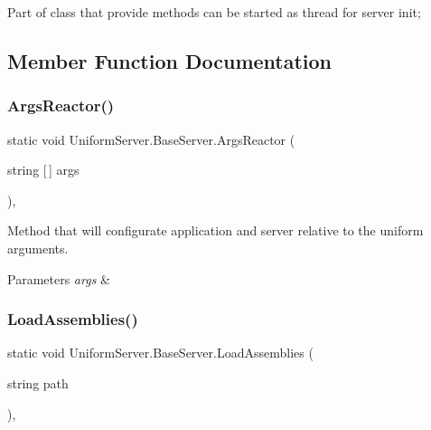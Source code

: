 Part of class that provide methods can be started as thread for server init; 

\subsection{Member Function Documentation}
\mbox{\label{class_uniform_server_1_1_base_server_a992660752da60019c348e18226a87bf2}} 
\subsubsection{\texorpdfstring{Args\+Reactor()}{ArgsReactor()}}
{\footnotesize\ttfamily static void Uniform\+Server.\+Base\+Server.\+Args\+Reactor (\begin{DoxyParamCaption}\item[{string \mbox{[}$\,$\mbox{]}}]{args }\end{DoxyParamCaption})\hspace{0.3cm}{\ttfamily [static]}, {\ttfamily [protected]}}



Method that will configurate application and server relative to the uniform arguments. 


\begin{DoxyParams}{Parameters}
{\em args} & \\
\hline
\end{DoxyParams}
\mbox{\label{class_uniform_server_1_1_base_server_a22b92ad517cd1003fe4fe3c86d857169}} 
\subsubsection{\texorpdfstring{Load\+Assemblies()}{LoadAssemblies()}}
{\footnotesize\ttfamily static void Uniform\+Server.\+Base\+Server.\+Load\+Assemblies (\begin{DoxyParamCaption}\item[{string}]{path }\end{DoxyParamCaption})\hspace{0.3cm}{\ttfamily [static]}, {\ttfamily [protected]}}



